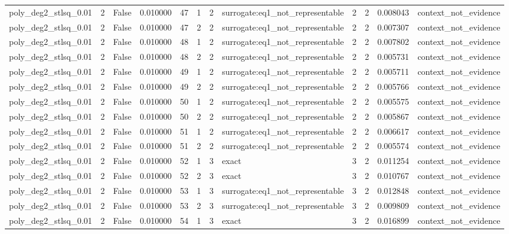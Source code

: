 \begin{tabular}{lrrrrrrlrrrl}
poly\_deg2\_stlsq\_0.01 & 2 & False & 0.010000 & 47 & 1 & 2 & surrogate:eq1\_not\_representable & 2 & 2 & 0.008043 & context\_not\_evidence \\
poly\_deg2\_stlsq\_0.01 & 2 & False & 0.010000 & 47 & 2 & 2 & surrogate:eq1\_not\_representable & 2 & 2 & 0.007307 & context\_not\_evidence \\
poly\_deg2\_stlsq\_0.01 & 2 & False & 0.010000 & 48 & 1 & 2 & surrogate:eq1\_not\_representable & 2 & 2 & 0.007802 & context\_not\_evidence \\
poly\_deg2\_stlsq\_0.01 & 2 & False & 0.010000 & 48 & 2 & 2 & surrogate:eq1\_not\_representable & 2 & 2 & 0.005731 & context\_not\_evidence \\
poly\_deg2\_stlsq\_0.01 & 2 & False & 0.010000 & 49 & 1 & 2 & surrogate:eq1\_not\_representable & 2 & 2 & 0.005711 & context\_not\_evidence \\
poly\_deg2\_stlsq\_0.01 & 2 & False & 0.010000 & 49 & 2 & 2 & surrogate:eq1\_not\_representable & 2 & 2 & 0.005766 & context\_not\_evidence \\
poly\_deg2\_stlsq\_0.01 & 2 & False & 0.010000 & 50 & 1 & 2 & surrogate:eq1\_not\_representable & 2 & 2 & 0.005575 & context\_not\_evidence \\
poly\_deg2\_stlsq\_0.01 & 2 & False & 0.010000 & 50 & 2 & 2 & surrogate:eq1\_not\_representable & 2 & 2 & 0.005867 & context\_not\_evidence \\
poly\_deg2\_stlsq\_0.01 & 2 & False & 0.010000 & 51 & 1 & 2 & surrogate:eq1\_not\_representable & 2 & 2 & 0.006617 & context\_not\_evidence \\
poly\_deg2\_stlsq\_0.01 & 2 & False & 0.010000 & 51 & 2 & 2 & surrogate:eq1\_not\_representable & 2 & 2 & 0.005574 & context\_not\_evidence \\
poly\_deg2\_stlsq\_0.01 & 2 & False & 0.010000 & 52 & 1 & 3 & exact & 3 & 2 & 0.011254 & context\_not\_evidence \\
poly\_deg2\_stlsq\_0.01 & 2 & False & 0.010000 & 52 & 2 & 3 & exact & 3 & 2 & 0.010767 & context\_not\_evidence \\
poly\_deg2\_stlsq\_0.01 & 2 & False & 0.010000 & 53 & 1 & 3 & surrogate:eq1\_not\_representable & 3 & 2 & 0.012848 & context\_not\_evidence \\
poly\_deg2\_stlsq\_0.01 & 2 & False & 0.010000 & 53 & 2 & 3 & surrogate:eq1\_not\_representable & 3 & 2 & 0.009809 & context\_not\_evidence \\
poly\_deg2\_stlsq\_0.01 & 2 & False & 0.010000 & 54 & 1 & 3 & exact & 3 & 2 & 0.016899 & context\_not\_evidence \\

\end{tabular}
